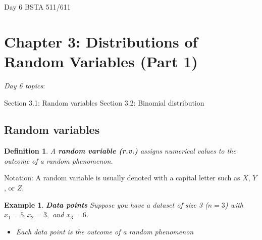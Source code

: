 \documentclass[12pt]{amsart}
\newtheorem{definition}[theorem]{Definition}
\newtheorem{example}[theorem]{Example}
\begin{document}
\setcounter{section}{3}
Day 6 BSTA 511/611
{\huge  
\section*{Chapter 3: Distributions of Random Variables (Part 1)}
}



{\large 

\emph{Day 6 topics}:

Section 3.1: Random variables  \newline
Section 3.2: Binomial distribution

\hrulefill

%
%
%
%
%
%


\subsection{Random variables}

\begin{definition} A \textbf{random variable (r.v.)} assigns numerical values to the outcome of a random phenomenon.
\end{definition}

Notation: \newline 
A random variable is usually denoted with a capital letter such as $X$, $Y$, or $Z$.

\vspace{1cm}
\begin{example}  \textbf{Data points} \newline
Suppose you have a dataset of size 3 ($n=3$) with $x_1 = 5, x_2 = 3,$ and $x_3 = 6$. 
\begin{itemize}
\item Each data point is the outcome of a random phenomenon


\end{itemize}
\end{example}}
\end{document}

